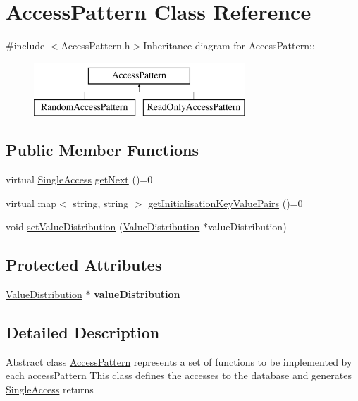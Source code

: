 \hypertarget{classAccessPattern}{
\section{AccessPattern Class Reference}
\label{classAccessPattern}
}


{\ttfamily \#include $<$AccessPattern.h$>$}Inheritance diagram for AccessPattern::\begin{figure}[H]
\begin{center}
\leavevmode
\includegraphics[height=2cm]{classAccessPattern}
\end{center}
\end{figure}
\subsection*{Public Member Functions}
\begin{DoxyCompactItemize}
\item 
virtual \hyperlink{structSingleAccess}{SingleAccess} \hyperlink{classAccessPattern_a8c46aedb717e862598524f250f23086f}{getNext} ()=0
\item 
virtual map$<$ string, string $>$ \hyperlink{classAccessPattern_afa72bed11401bfd96e8fa88acd72934b}{getInitialisationKeyValuePairs} ()=0
\item 
void \hyperlink{classAccessPattern_a80227f44091a53a2798b44e4e54f3484}{setValueDistribution} (\hyperlink{classValueDistribution}{ValueDistribution} $\ast$valueDistribution)
\end{DoxyCompactItemize}
\subsection*{Protected Attributes}
\begin{DoxyCompactItemize}
\item 
\hypertarget{classAccessPattern_af87b840d2a9edad3c3fbf9a521844588}{
\hyperlink{classValueDistribution}{ValueDistribution} $\ast$ {\bfseries valueDistribution}}
\label{classAccessPattern_af87b840d2a9edad3c3fbf9a521844588}

\end{DoxyCompactItemize}


\subsection{Detailed Description}
Abstract class \hyperlink{classAccessPattern}{AccessPattern} represents a set of functions to be implemented by each accessPattern This class defines the accesses to the database and generates \hyperlink{structSingleAccess}{SingleAccess} returns 

